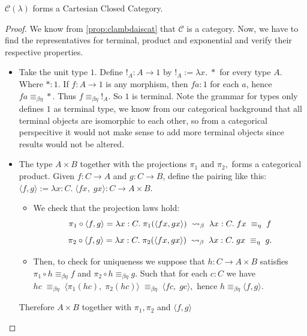\begin{proposition}
  $\mathcal{C}(\lambda)$ forms a Cartesian Closed Category.
\end{proposition}

\begin{proof}
  We know from \ref{prop:clambdaiscat} that $\mathcal{C}$ is a category. Now, we have to find the representatives for terminal, product and exponential and verify their respective properties.

  \begin{itemize}
  \item Take the unit type $1$. Define $!_A:A\to 1$ by
    \(
    !_A := \lambda x.\; *
    \) for every type $A$.
    Where $*:1$. If $f:A\to 1$ is any morphism, then $f a:1$ for each $a$, hence $f a \equiv_{\beta\eta} *$. Thus $f \equiv_{\beta\eta} !_A$. So $1$ is terminal. Note the grammar for types only defines $1$ as terminal type, we know from our categorical background that all terminal objects are isomorphic to each other, so from a categorical perspecitive it would not make sense to add more terminal objects since results would not be altered.
  \item The type $A \times B$ together with the projections
    \(
    \pi_1 \text{ and } \pi_2,
    \)
    forms a categorical product. Given $f:C \to A$ and $g:C \to B$, define the pairing like this:
    \(
      \langle f,g \rangle := \lambda x:C.\; \langle f x,\; g x \rangle : C \to A \times B.
    \)
    \begin{itemize}
      \item We check that the projection laws hold:
      \[
        \pi_1 \circ \langle f,g \rangle 
        = \lambda x:C.\; \pi_1(\langle f x, g x \rangle) 
        \;\mathrel{\leadsto}_\beta\; \lambda x:C.\; f x 
        \;\equiv_\eta\; f
      \]
      \[
        \pi_2 \circ \langle f,g \rangle 
        = \lambda x:C.\; \pi_2(\langle f x, g x \rangle) 
        \;\mathrel{\leadsto}_\beta\; \lambda x:C.\; g x 
        \;\equiv_\eta\; g.
      \]
      \item Then, to check for uniqueness we suppose that $h:C \to A \times B$ satisfies
      $\pi_1 \circ h \equiv_{\beta\eta} f$ and $\pi_2 \circ h \equiv_{\beta\eta} g$. Such that for each $c:C$ we have
      \(
        h c \;\equiv_{\beta\eta}\; \langle \pi_1(h c),\; \pi_2(h c)\rangle
        \;\equiv_{\beta\eta}\; \langle f c,\; g c\rangle,
      \)
      hence $h \equiv_{\beta\eta} \langle f,g \rangle$.
    \end{itemize}
    Therefore $A \times B$ together with $\pi_1, \pi_2$ and $\langle f,g \rangle$ 

\end{itemize}
\end{proof}
